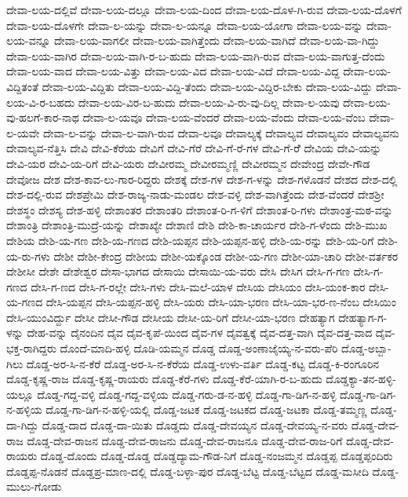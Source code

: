 ದೇವಾ-ಲಯ-ದಲ್ಲಿವೆ
ದೇವಾ-ಲಯ-ದಲ್ಲೂ
ದೇವಾ-ಲಯ-ದಿಂದ
ದೇವಾ-ಲಯ-ದೊಳ-ಗಿ-ರುವ
ದೇವಾ-ಲಯ-ದೊಳಗೆ
ದೇವಾ-ಲಯ-ದೊಳಗೇ
ದೇವಾ-ಲ-ಯನ್ನು
ದೇವಾ-ಲ-ಯನ್ನೂ
ದೇವಾ-ಲಯ-ಯೋಗಾ
ದೇವಾ-ಲಯ-ವನ್ನು
ದೇವಾ-ಲಯ-ವನ್ನೂ
ದೇವಾ-ಲಯ-ವಾಗಲೀ
ದೇವಾ-ಲಯ-ವಾಗಿತ್ತೆಂದು
ದೇವಾ-ಲಯ-ವಾಗಿದೆ
ದೇವಾ-ಲಯ-ವಾ-ಗಿದ್ದು
ದೇವಾ-ಲಯ-ವಾಗಿರ
ದೇವಾ-ಲಯ-ವಾಗಿ-ರ-ಬ-ಹುದು
ದೇವಾ-ಲಯ-ವಾಗಿ-ರುವ
ದೇವಾ-ಲಯ-ವಾಗುತ್ತ-ದೆಂದು
ದೇವಾ-ಲಯ-ವಾದ
ದೇವಾ-ಲಯ-ವಿತ್ತು
ದೇವಾ-ಲಯ-ವಿದ
ದೇವಾ-ಲಯ-ವಿದೆ
ದೇವಾ-ಲಯ-ವಿದ್ದ
ದೇವಾ-ಲಯ-ವಿದ್ದಿತಂತೆ
ದೇವಾ-ಲಯ-ವಿದ್ದಿತು
ದೇವಾ-ಲಯ-ವಿದ್ದಿ-ತೆಂದು
ದೇವಾ-ಲಯ-ವಿದ್ದಿರ-ಬೇಕು
ದೇವಾ-ಲಯ-ವಿದ್ದು
ದೇವಾ-ಲಯ-ವಿ-ರ-ಬಹದು
ದೇವಾ-ಲಯ-ವಿರ-ಬ-ಹುದು
ದೇವಾ-ಲಯ-ವಿ-ರು-ವು-ದಿಲ್ಲ
ದೇವಾ-ಲ-ಯವು
ದೇವಾ-ಲಯ-ವು-ಹಲಗೆ-ಕಾರ-ನಾಥ
ದೇವಾ-ಲ-ಯವೂ
ದೇವಾ-ಲಯ-ವೆಂದರೆ
ದೇವಾ-ಲಯ-ವೆಂದು
ದೇವಾ-ಲಯ-ವೆಂಬ
ದೇವಾ-ಲ-ಯವೇ
ದೇವಾ-ಲ-ವನ್ನು
ದೇವಾ-ಲ-ವಾಗಿ-ರುವ
ದೇವಾ-ಲವೂ
ದೇವಾಲ್ಯಕ್ಕೆ
ದೇವಾಲ್ಯವ
ದೇವಾಲ್ಯವಂ
ದೇವಾಲ್ಯವನು
ದೇವಾಲ್ಯವ-ನೆತ್ತಿಸಿ
ದೇವಿ
ದೇವಿ-ಕೆರೆಯ
ದೇವಿಗೆ
ದೇವಿ-ಗೆರೆ
ದೇವಿ-ಗೆ-ರೆ-ಗಳ
ದೇವಿ-ಗೆ-ರೆೆ
ದೇವಿಯ
ದೇವಿ-ಯನ್ನು
ದೇವಿ-ಯರ
ದೇವಿ-ಯ-ರಿಗೆ
ದೇವಿ-ಯರು
ದೇವೀರಮ್ಮ
ದೇವೀರಮ್ಮಣ್ಣಿ
ದೇವೀರಮ್ಮನ
ದೇವೇಂದ್ರ
ದೇವೇ-ಗೌಡ
ದೇವೋಜ
ದೇಶ
ದೇಶ-ಕಾವ-ಲು-ಗಾರ-ರಿದ್ದರು
ದೇಶಕ್ಕೆ
ದೇಶ-ಗಳ
ದೇಶ-ಗ-ಳನ್ನು
ದೇಶ-ಗಳೊಡನೆ
ದೇಶದ
ದೇಶ-ದಲ್ಲಿ
ದೇಶ-ದಲ್ಲಿ-ರುವ
ದೇಶಪ್ರೇಮಿ
ದೇಶ-ರಾಜ್ಯ-ನಾಡು-ಮಂಡಲ
ದೇಶ-ವಳ್ಳಿ
ದೇಶ-ವಾಗಿತ್ತೆಂದು
ದೇಶ-ವೆಂದರೆ
ದೇಶಶ್ರೀ
ದೇಶಸ್ಥಂ
ದೇಶಸ್ಯ
ದೇಶ-ಹಳ್ಳಿ
ದೇಶಾಂತರ
ದೇಶಾಂತರಿ
ದೇಶಾಂತ-ರಿ-ಗ-ಳಿಗೆ
ದೇಶಾಂತ-ರಿ-ಗಳು
ದೇಶಾಂತ್ರ-ಮಠ-ವನ್ನು
ದೇಶಾಂತ್ರಿ
ದೇಶಾಂತ್ರಿ-ಮುದ್ರೆ-ಯನ್ನು
ದೇಶಾಖ್ಯೇ
ದೇಶಾಣಿ
ದೇಶಿ
ದೇಶಿ-ಕಾ-ಚಾರ್ಯರ
ದೇಶಿ-ಗ-ಳೆಂದು
ದೇಶಿ-ಮುಖ
ದೇಶಿಯ
ದೇಶಿ-ಯ-ಗಣ
ದೇಶಿ-ಯ-ಗಣದ
ದೇಶಿ-ಯಪ್ಪನ
ದೇಶಿ-ಯಪ್ಪನ-ಹಳ್ಳಿ
ದೇಶಿ-ಯ-ರನ್ನು
ದೇಶಿ-ಯ-ರಿಗೆ
ದೇಶಿ-ಯ-ರು-ಗಳು
ದೇಶೀ
ದೇಶೀ-ಕೇಂದ್ರ
ದೇಶೀಯ
ದೇಶೀ-ಯಕ್ಕೊಂಡ
ದೇಶೀ-ಯ-ಗಣ
ದೇಶೀ-ಯಾ-ಚಾರಿ
ದೇಶೀ-ವರ್ತಕರ
ದೇಶೀಸೀ
ದೇಶೇ
ದೇಶೇಶ್ವರ
ದೇಸಾ-ಭಾಗದ
ದೇಸಾಯಿ
ದೇಸಾಯಿ-ಯ-ವರು
ದೇಸಿ
ದೇಸಿಗ
ದೇಸಿ-ಗ-ಗಣ
ದೇಸಿ-ಗ-ಗಣದ
ದೇಸಿ-ಗ-ಣದ
ದೇಸಿ-ಗ-ರಲ್ಲೇ
ದೇಸಿ-ಗಳು
ದೇಸಿ-ಮಲೆ-ಯಾಳ
ದೇಸಿಯ
ದೇಸಿಯಂ
ದೇಸಿ-ಯಂಕ-ಕಾರ
ದೇಸಿ-ಯ-ಗಣದ
ದೇಸಿ-ಯಪ್ಪನ
ದೇಸಿ-ಯಪ್ಪನ-ಹಳ್ಳಿ
ದೇಸಿ-ಯರು
ದೇಸಿ-ಯಾ-ಭರಣ
ದೇಸಿ-ಯಾ-ಭರ-ಣ-ನೆಂಬ
ದೇಸಿಯಿಂ
ದೇಸಿ-ಯುಂವಿರ್ದ್ದು
ದೇಸೀ
ದೇಸೀ-ಗೌಡ
ದೇಸೀಯ
ದೇಸೀ-ಯ-ರಿಗೆ
ದೇಸೀ-ಯಾ-ಭರಣ
ದೇಹತ್ಯಾಗ
ದೇಹತ್ಯಾಗ-ಗ-ಳನ್ನು
ದೇಹ-ವನ್ನು
ದೈನಂದಿನ
ದೈವ
ದೈವ-ಕೃಪೆ-ಯಿಂದ
ದೈವ-ಗಳ
ದೈವತ್ವಕ್ಕೆ
ದೈವ-ದತ್ತ-ವಾಗಿ
ದೈವ-ದತ್ತ-ವಾದ
ದೈವ-ಭಕ್ತ-ರಾಗಿದ್ದರು
ದೊಂದೆ-ಮಾದಿ-ಹಳ್ಳಿ
ದೊಡಿ-ಯಮ್ಮನ
ದೊಡ್ಡ
ದೊಡ್ಡ-ಅಂಣಾಜೈಯ್ಯ-ನ-ವರು-ಪೆರಿ
ದೊಡ್ಡ-ಅಬ್ಬಾ-ಗಿಲು
ದೊಡ್ಡ-ಅರ-ಸಿ-ನ-ಕೆರೆ
ದೊಡ್ಡ-ಅರ-ಸಿ-ನ-ಕೆರೆಯ
ದೊಡ್ಡ-ಉಳು-ವರ್ತಿ
ದೊಡ್ಡ-ಕಟ್ಟ
ದೊಡ್ಡ-ಕಿ-ರಂಗೂರಿನ
ದೊಡ್ಡ-ಕೃಷ್ಣ-ರಾಜ
ದೊಡ್ಡ-ಕೃಷ್ಣ-ರಾಯರು
ದೊಡ್ಡ-ಕೆರೆ-ಗಳು
ದೊಡ್ಡ-ಕೆರೆ-ಯಾಗಿ-ರ-ಬ-ಹುದು
ದೊಡ್ಡಕ್ಯಾ-ತನ-ಹಳ್ಳಿ-ಯಲ್ಲೂ
ದೊಡ್ಡ-ಗದ್ದ-ವಳ್ಳಿ
ದೊಡ್ಡ-ಗದ್ದ-ವಳ್ಳಿಯ
ದೊಡ್ಡ-ಗರು-ಡ-ನ-ಹಳ್ಳಿ
ದೊಡ್ಡ-ಗಾ-ಡಿಗ-ನ-ಹಳ್ಳಿ
ದೊಡ್ಡ-ಗಾ-ಡಿಗ-ನ-ಹಳ್ಳಿಯ
ದೊಡ್ಡ-ಗಾ-ಡಿಗ-ನ-ಹಳ್ಳಿ-ಯಲ್ಲಿ
ದೊಡ್ಡ-ಜಟಕ
ದೊಡ್ಡ-ಜಟಕದ
ದೊಡ್ಡ-ಜಟಕಾ
ದೊಡ್ಡ-ತಮ್ಮಣ್ಣ
ದೊಡ್ಡ-ದಾ-ಗಿದ್ದು
ದೊಡ್ಡ-ದಾದ
ದೊಡ್ಡ-ದಾ-ಯಿತು
ದೊಡ್ಡದು
ದೊಡ್ಡ-ದೇವಯ್ಯನ
ದೊಡ್ಡ-ದೇವಯ್ಯ-ನ-ವರು
ದೊಡ್ಡ-ದೇವ-ರಾಜ
ದೊಡ್ಡ-ದೇವ-ರಾಜನ
ದೊಡ್ಡ-ದೇವ-ರಾಜನು
ದೊಡ್ಡ-ದೇವ-ರಾಜನೂ
ದೊಡ್ಡ-ದೇವ-ರಾಜ-ರಿಗೆ
ದೊಡ್ಡ-ದೇವ-ರಾಯರು
ದೊಡ್ಡ-ದೊಂದು
ದೊಡ್ಡ-ದೊಡ್ಡ
ದೊಡ್ಡದ್ಯಾಮ-ಗೌಡ-ನಿಗೆ
ದೊಡ್ಡ-ನಂಜಮ್ಮನ
ದೊಡ್ಡಪ್ಪ
ದೊಡ್ಡಪ್ಪಂದಿರು
ದೊಡ್ಡಪ್ಪ-ನೊಡನೆ
ದೊಡ್ಡಪ್ರ-ಮಾಣ-ದಲ್ಲಿ
ದೊಡ್ಡ-ಬಳ್ಳಾ-ಪುರ
ದೊಡ್ಡ-ಬೆಟ್ಟ
ದೊಡ್ಡ-ಬೆಟ್ಟದ
ದೊಡ್ಡ-ಮಸೀದಿ
ದೊಡ್ಡ-ಮುಲು-ಗೋಡು
